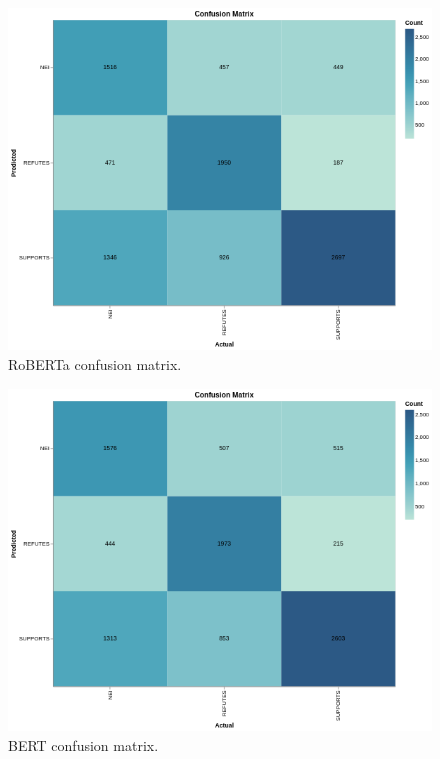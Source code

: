 \documentclass[conference]{IEEEtran}
\begin{document}
\begin{appendices}
\begin{figure}[htp]
    \centering
    \includegraphics[scale=0.5]{confusion_matrix_roberta.png}\hfill
    \caption{RoBERTa confusion matrix.}
    \label{fig:confusion_matrix_roberta}
\end{figure}


\begin{figure}[htp]
    \centering
    \includegraphics[scale=0.5]{cm_bert.png}\hfill
    \caption{BERT confusion matrix.}
    \label{fig:cm_bert}
\end{figure}


\end{appendices}
\end{document}

